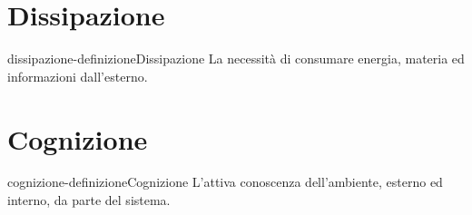 \documentclass[preview]{standalone}
\begin{document}
\section{Dissipazione}

\begin{snippetdefinition}{dissipazione-definizione}{Dissipazione}
    La necessità di consumare energia, materia ed informazioni dall'esterno.
\end{snippetdefinition}


\section{Cognizione}

\begin{snippetdefinition}{cognizione-definizione}{Cognizione}
    L'attiva conoscenza dell'ambiente, esterno ed interno, da parte del sistema.
\end{snippetdefinition}
\end{document}
